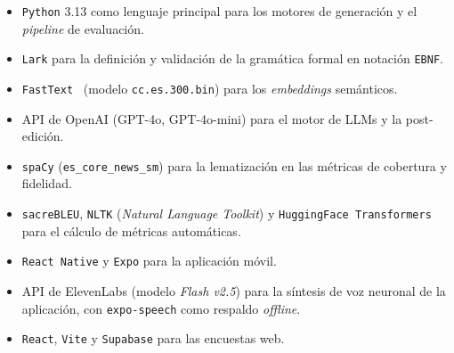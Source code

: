 \begin{itemize}
    \item \texttt{Python} 3.13 como lenguaje principal para los motores de generación y el \textit{pipeline} de evaluación.
    \item \texttt{Lark} para la definición y validación de la gramática formal en notación \texttt{EBNF}.
    \item \texttt{FastText}~\cite{bojanowski2017fasttext} (modelo \texttt{cc.es.300.bin}) para los \textit{embeddings} semánticos.
    \item API de OpenAI (GPT-4o, GPT-4o-mini) para el motor de LLMs y la post-edición.
    \item \texttt{spaCy} (\texttt{es\_core\_news\_sm}) para la lematización en las métricas de cobertura y fidelidad.
    \item \texttt{sacreBLEU}, \texttt{NLTK} (\textit{Natural Language Toolkit}) y \texttt{HuggingFace Transformers} para el cálculo de métricas automáticas.
    \item \texttt{React Native} y \texttt{Expo} para la aplicación móvil.
    \item API de ElevenLabs (modelo \textit{Flash v2.5}) para la síntesis de voz neuronal de la aplicación, con \texttt{expo-speech} como respaldo \textit{offline}.
    \item \texttt{React}, \texttt{Vite} y \texttt{Supabase} para las encuestas web.
\end{itemize}

